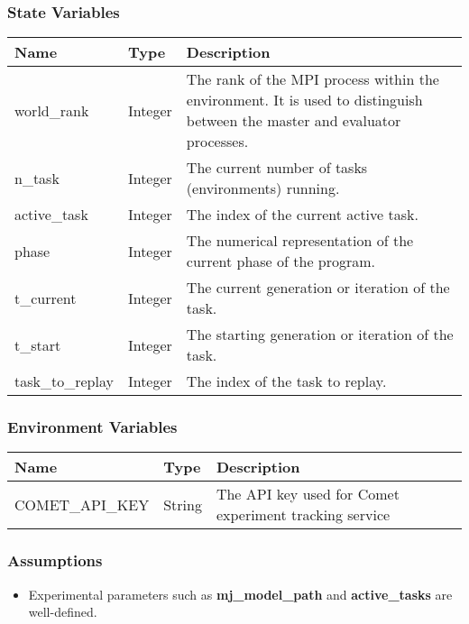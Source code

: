 \documentclass[12pt, titlepage]{article}
\begin{document}
\subsubsection{State Variables}
\begin{center}
  \begin{tabular}{p{4cm} p{3cm} p{7cm}}
  \hline
  \textbf{Name} & \textbf{Type} & \textbf{Description} \\
  \hline
  world\_rank & Integer & The rank of the MPI process within the environment. It is used to distinguish between the master and evaluator processes. \\
  \hline
  n\_task & Integer & The current number of tasks (environments) running. \\
  \hline
  active\_task & Integer & The index of the current active task. \\
  \hline
  phase & Integer & The numerical representation of the current phase of the program. \\
  \hline
  t\_current & Integer & The current generation or iteration of the task. \\
  \hline
  t\_start & Integer & The starting generation or iteration of the task. \\
  \hline
  task\_to\_replay & Integer & The index of the task to replay. \\
  \hline
  \end{tabular}
\end{center}

\subsubsection{Environment Variables}
\begin{center}
  \begin{tabular}{p{4cm} p{4cm} p{6cm}}
  \hline
  \textbf{Name} & \textbf{Type} & \textbf{Description} \\
  \hline
  COMET\_API\_KEY & String & The API key used for Comet experiment tracking service \\
  \hline
  \end{tabular}
  \end{center}

\subsubsection{Assumptions}
\begin{itemize}
  \item Experimental parameters such as \textbf{mj\_model\_path} and \textbf{active\_tasks} are well-defined. 
\end{itemize}
\end{document}

